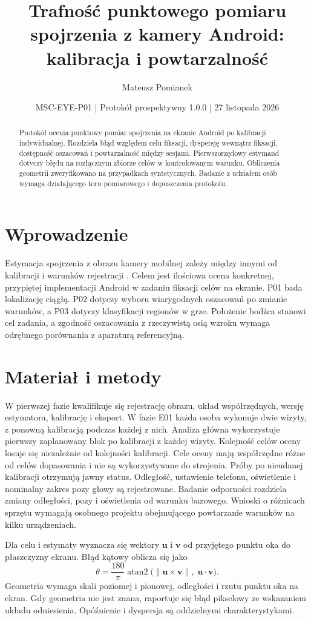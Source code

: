 \documentclass[11pt,a4paper]{article}
\title{Trafność punktowego pomiaru spojrzenia z kamery Android: kalibracja i powtarzalność}
\author{Mateusz Pomianek}
\date{MSC-EYE-P01 | Protokół prospektywny 1.0.0 | 27 listopada 2026}
\begin{document}
\maketitle
\begin{abstract}
Protokół ocenia punktowy pomiar spojrzenia na ekranie Android po kalibracji indywidualnej. Rozdziela błąd względem celu fiksacji, dyspersję wewnątrz fiksacji, dostępność oszacowań i powtarzalność między sesjami. Pierwszorzędowy estymand dotyczy błędu na rozłącznym zbiorze celów w kontrolowanym warunku. Obliczenia geometrii zweryfikowano na przypadkach syntetycznych. Badanie z udziałem osób wymaga działającego toru pomiarowego i dopuszczenia protokołu.
\end{abstract}
\section{Wprowadzenie}
Estymacja spojrzenia z obrazu kamery mobilnej zależy między innymi od kalibracji i warunków rejestracji \citep{krafka}. Celem jest ilościowa ocena konkretnej, przypiętej implementacji Android w zadaniu fiksacji celów na ekranie. P01 bada lokalizację ciągłą. P02 dotyczy wyboru wiarygodnych oszacowań po zmianie warunków, a P03 dotyczy klasyfikacji regionów w grze. Położenie bodźca stanowi cel zadania, a zgodność oszacowania z rzeczywistą osią wzroku wymaga odrębnego porównania z aparaturą referencyjną.

\section{Materiał i metody}
W pierwszej fazie kwalifikuje się rejestrację obrazu, układ współrzędnych, wersję estymatora, kalibrację i eksport. W fazie E01 każda osoba wykonuje dwie wizyty, z ponowną kalibracją podczas każdej z nich. Analiza główna wykorzystuje pierwszy zaplanowany blok po kalibracji z każdej wizyty. Kolejność celów oceny losuje się niezależnie od kolejności kalibracji. Cele oceny mają współrzędne różne od celów dopasowania i nie są wykorzystywane do strojenia. Próby po nieudanej kalibracji otrzymują jawny status. Odległość, ustawienie telefonu, oświetlenie i nominalny zakres pozy głowy są rejestrowane. Badanie odporności rozdziela zmiany odległości, pozy i oświetlenia od warunku bazowego. Wnioski o różnicach sprzętu wymagają osobnego projektu obejmującego powtarzanie warunków na kilku urządzeniach.

Dla celu i estymaty wyznacza się wektory $\mathbf u$ i $\mathbf v$ od przyjętego punktu oka do płaszczyzny ekranu. Błąd kątowy oblicza się jako
\[
 \theta=\frac{180}{\pi}\operatorname{atan2}
 \bigl(\lVert\mathbf u\times\mathbf v\rVert,\;\mathbf u\cdot\mathbf v\bigr).
\]
Geometria wymaga skali poziomej i pionowej, odległości i rzutu punktu oka na ekran. Gdy geometria nie jest znana, raportuje się błąd pikselowy ze wskazaniem układu odniesienia. Opóźnienie i dyspersja są oddzielnymi charakterystykami.
\end{document}
